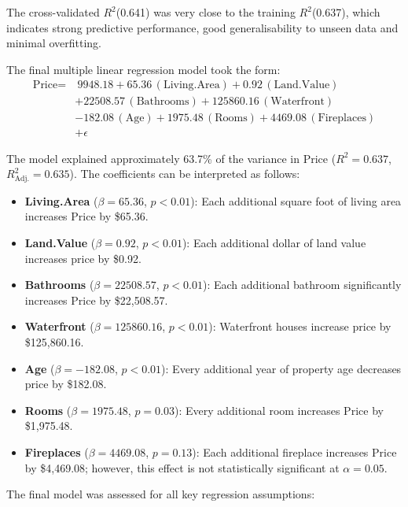 \documentclass[letterpaper,9pt,twocolumn,twoside,]{pinp}
\providecommand{\tightlist}{%
  \setlength{\itemsep}{0pt}\setlength{\parskip}{0pt}}
\begin{document}
The cross-validated \(R^2\)(0.641) was very close to the training
\(R^2\)(0.637), which indicates strong predictive performance, good
generalisability to unseen data and minimal overfitting.

The final multiple linear regression model took the form: \[
\begin{aligned}
\text{Price} = & \ 9948.18 + 65.36 \, (\text{Living.Area}) + 0.92 \, (\text{Land.Value}) \\
               & + 22508.57 \, (\text{Bathrooms}) + 125860.16 \, (\text{Waterfront}) \\
               & - 182.08 \, (\text{Age}) + 1975.48 \, (\text{Rooms}) + 4469.08 \, (\text{Fireplaces}) \\
               & + \epsilon
\end{aligned}
\]

The model explained approximately 63.7\% of the variance in Price
(\(R^2 = 0.637\), \(R^2_{\text{Adj.}} = 0.635\)). The coefficients can
be interpreted as follows:

\begin{itemize}
\tightlist
\item
  \textbf{Living.Area} (\(\beta = 65.36\), \(p < 0.01\)): Each
  additional square foot of living area increases Price by \$65.36.
\item
  \textbf{Land.Value} (\(\beta = 0.92\), \(p < 0.01\)): Each additional
  dollar of land value increases price by \$0.92.
\item
  \textbf{Bathrooms} (\(\beta = 22508.57\), \(p < 0.01\)): Each
  additional bathroom significantly increases Price by \$22,508.57.
\item
  \textbf{Waterfront} (\(\beta = 125860.16\), \(p < 0.01\)): Waterfront
  houses increase price by \$125,860.16.
\item
  \textbf{Age} (\(\beta = -182.08\), \(p < 0.01\)): Every additional
  year of property age decreases price by \$182.08.
\item
  \textbf{Rooms} (\(\beta = 1975.48\), \(p = 0.03\)): Every additional
  room increases Price by \$1,975.48.
\item
  \textbf{Fireplaces} (\(\beta = 4469.08\), \(p = 0.13\)): Each
  additional fireplace increases Price by \$4,469.08; however, this
  effect is not statistically significant at \(\alpha = 0.05\).
\end{itemize}

The final model was assessed for all key regression assumptions:
\end{document}
